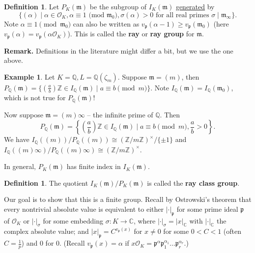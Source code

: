 \documentclass{article}
\theoremstyle{definition}
\newtheorem{example}{Example}[section]
\newtheorem{defn}[theorem]{Definition}
\begin{document}
\begin{defn}
    Let $P_K(\mathfrak{m})$ be the subgroup of $I_K(\mathfrak{m})$ \underline{generated} by 
    \[
        \{(\alpha) \mid \alpha \in \mathcal{O}_K, \alpha \equiv 1 \text{ (mod }\mathfrak{m}_0), \sigma(\alpha)>0 \text{ for all real primes }\sigma \mid \mathfrak{m}_{\infty}\}.
    \]
    Note $\alpha \equiv 1 \pmod{\mathfrak{m}_0}$ can also be written as $v_{\mathfrak{p}}(\alpha-1) \ge v_{\mathfrak{p}}(\mathfrak{m}_0)$ (here $v_{\mathfrak{p}}(\alpha) = v_{\mathfrak{p}}(\alpha \mathcal{O}_K)$). This is called the \textbf{ray} or \textbf{ray group} for $\mathfrak{m}$.
\end{defn}
\textbf{Remark.} Definitions in the literature might differ a bit, but we use the one above.
\begin{example}
    Let $K = \mathbb{Q}, L = \mathbb{Q}(\zeta_m)$. Suppose $\mathfrak{m} = (m)$, then $P_{\mathbb{Q}}(\mathfrak{m}) = \{\left(\frac{a}{b}\right)\mathbb{Z} \in I_{\mathbb{Q}}(\mathfrak{m}) \mid a \equiv b \pmod{m}\}$. Note $I_{\mathbb{Q}}(\mathfrak{m}) = I_{\mathbb{Q}}(\mathfrak{m}_0)$, which is not true for $P_\mathbb{Q}(\mathfrak{m})$!
    \vspace{1mm}
     
    Now suppose $\mathfrak{m} = (m)\infty$ -- the infinite prime of $\mathbb{Q}$. Then \[
    P_\mathbb{Q}(\mathfrak{m}) = \left\{\left(\frac{a}{b}\right)\mathbb{Z} \in I_\mathbb{Q}(\mathfrak{m}) \mid a \equiv b\pmod{m}, \frac{a}{b}>0\right\}.
    \]
    We have $I_{\mathbb{Q}}((m))/P_\mathbb{Q}((m)) \cong (\mathbb{Z}/m\mathbb{Z})^\times/\{\pm 1\}$ and $I_\mathbb{Q}((m)\infty)/P_\mathbb{Q}((m)\infty) \cong (\mathbb{Z}/m\mathbb{Z})^\times$. 
\end{example}
In general, $P_K(\mathfrak{m})$ has finite index in $I_K(\mathfrak{m})$.
\begin{defn}
    The quotient $I_K(\mathfrak{m})/P_K(\mathfrak{m})$ is called the \textbf{ray class group}.
\end{defn}
Our goal is to show that this is a finite group. Recall by Ostrowski's theorem that every nontrivial absolute value is equivalent to either $|\cdot|_{\mathfrak{p}}$ for some prime ideal $\mathfrak{p}$ of $\mathcal{O}_K$ or $|\cdot|_{\sigma}$ for some embedding $\sigma : K \to \mathbb{C}$, where $|\cdot|_{\sigma} = |x|_{\mathbb{C}}$ with $|\cdot|_{\mathbb{C}}$ the complex absolute value; and $|x|_{\mathfrak{p}} = C^{v_\mathfrak{p}(x)}$ for $x \neq 0$ for some $0<C<1$ (often $C =\frac{1}{p}$) and $0$ for $0$. (Recall $v_{\mathfrak{p}}(x) = \alpha$ if $x \mathcal{O}_K = \mathfrak{p}^\alpha \mathfrak{p}_1^{\alpha_1}\ldots \mathfrak{p}_r^{\alpha_r}$.)
\end{document}
